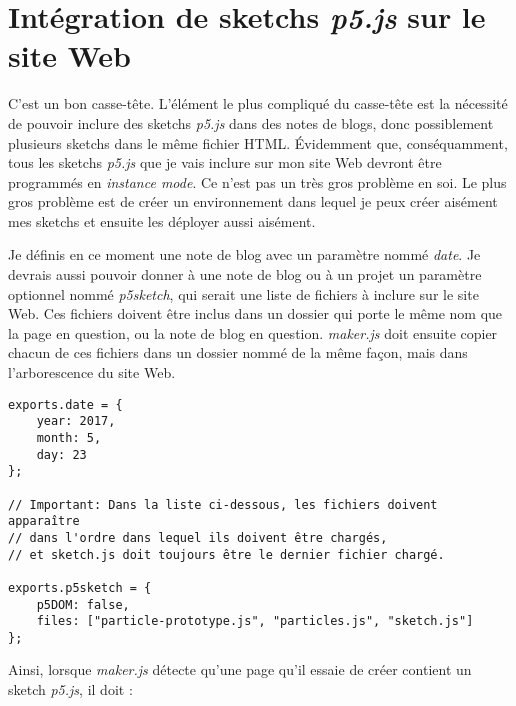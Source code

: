 \newpage
\section{Intégration de sketchs \textit{p5.js} sur le site Web}

C'est un bon casse-tête. L'élément le plus compliqué du casse-tête est la nécessité de pouvoir inclure des sketchs \textit{p5.js} dans des notes de blogs, donc possiblement plusieurs sketchs dans le même fichier HTML. Évidemment que, conséquamment, tous les sketchs \textit{p5.js} que je vais inclure sur mon site Web devront être programmés en \textit{instance mode}. Ce n'est pas un très gros problème en soi. Le plus gros problème est de créer un environnement dans lequel je peux créer aisément mes sketchs et ensuite les déployer aussi aisément.

Je définis en ce moment une note de blog avec un paramètre nommé \textit{date}. Je devrais aussi pouvoir donner à une note de blog ou à un projet un paramètre optionnel nommé \textit{p5sketch}, qui serait une liste de fichiers à inclure sur le site Web. Ces fichiers doivent être inclus dans un dossier qui porte le même nom que la page en question, ou la note de blog en question. \textit{maker.js} doit ensuite copier chacun de ces fichiers dans un dossier nommé de la même façon, mais dans l'arborescence du site Web. 

\begin{lstlisting}
exports.date = {
    year: 2017,
    month: 5,
    day: 23
};

// Important: Dans la liste ci-dessous, les fichiers doivent apparaître 
// dans l'ordre dans lequel ils doivent être chargés, 
// et sketch.js doit toujours être le dernier fichier chargé.

exports.p5sketch = {
    p5DOM: false,
    files: ["particle-prototype.js", "particles.js", "sketch.js"]
};
\end{lstlisting}

Ainsi, lorsque \textit{maker.js} détecte qu'une page qu'il essaie de créer contient un sketch \textit{p5.js}, il doit :


